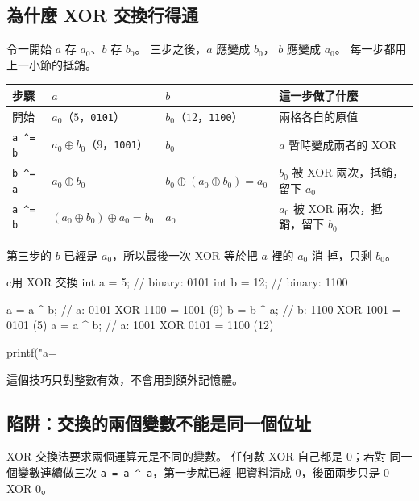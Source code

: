 \subsection{為什麼 XOR 交換行得通}

令一開始 $a$ 存 $a_0$、$b$ 存 $b_0$。 三步之後，$a$ 應變成 $b_0$，
$b$ 應變成 $a_0$。 每一步都用上一小節的抵銷。

\begin{center}
\begin{tabular}{|l|l|l|l|}
\hline
\textbf{步驟} & \textbf{$a$} & \textbf{$b$} & \textbf{這一步做了什麼} \\
\hline
開始 & $a_0$（$5$，\texttt{0101}） & $b_0$（$12$，\texttt{1100}） &
兩格各自的原值 \\
\texttt{a \textasciicircum{}= b} & $a_0 \oplus b_0$（$9$，\texttt{1001}） &
$b_0$ & $a$ 暫時變成兩者的 XOR \\
\texttt{b \textasciicircum{}= a} & $a_0 \oplus b_0$ &
$b_0 \oplus (a_0 \oplus b_0) = a_0$ & $b_0$ 被 XOR 兩次，抵銷，留下
$a_0$ \\
\texttt{a \textasciicircum{}= b} &
$(a_0 \oplus b_0) \oplus a_0 = b_0$ & $a_0$ & $a_0$ 被 XOR 兩次，抵
銷，留下 $b_0$ \\
\hline
\end{tabular}
\end{center}

第三步的 $b$ 已經是 $a_0$，所以最後一次 XOR 等於把 $a$ 裡的 $a_0$ 消
掉，只剩 $b_0$。

\begin{code}{c}{用 XOR 交換}
int a = 5;   // binary: 0101
int b = 12;  // binary: 1100

a = a ^ b;  // a: 0101 XOR 1100 = 1001 (9)
b = b ^ a;  // b: 1100 XOR 1001 = 0101 (5)
a = a ^ b;  // a: 1001 XOR 0101 = 1100 (12)

printf("a=%
\end{code}

這個技巧只對整數有效，不會用到額外記憶體。

\subsection[陷阱：交換的兩變數不能同位址]{陷阱：交換的兩個變數不能是同一個位址}

XOR 交換法要求兩個運算元是不同的變數。 任何數 XOR 自己都是 $0$；若對
同一個變數連續做三次 \texttt{a = a \textasciicircum{} a}，第一步就已經
把資料清成 $0$，後面兩步只是 $0$ XOR $0$。

